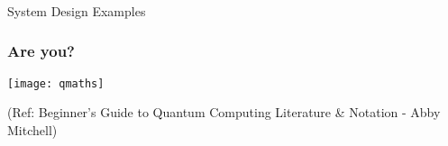 \begin{frame}[fragile]\frametitle{}
\begin{center}
{\Large System Design Examples}
\end{center}

\end{frame}


 \begin{frame}[fragile]\frametitle{Are you?}

\begin{center}
\texttt{[image: qmaths]}
\end{center}

\tiny{(Ref: Beginner’s Guide to Quantum Computing Literature \& Notation - Abby Mitchell)}

\end{frame}

